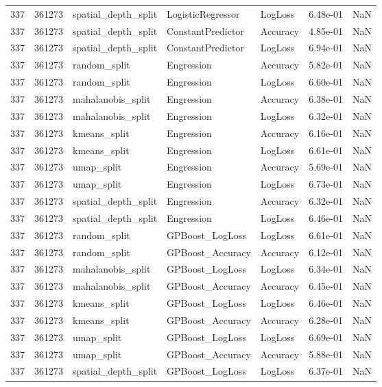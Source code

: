 \begin{tabular}{rrlllrr}
337 & 361273 & spatial\_depth\_split & LogisticRegressor & LogLoss & 6.48e-01 & NaN \\
337 & 361273 & spatial\_depth\_split & ConstantPredictor & Accuracy & 4.85e-01 & NaN \\
337 & 361273 & spatial\_depth\_split & ConstantPredictor & LogLoss & 6.94e-01 & NaN \\
337 & 361273 & random\_split & Engression & Accuracy & 5.82e-01 & NaN \\
337 & 361273 & random\_split & Engression & LogLoss & 6.60e-01 & NaN \\
337 & 361273 & mahalanobis\_split & Engression & Accuracy & 6.38e-01 & NaN \\
337 & 361273 & mahalanobis\_split & Engression & LogLoss & 6.32e-01 & NaN \\
337 & 361273 & kmeans\_split & Engression & Accuracy & 6.16e-01 & NaN \\
337 & 361273 & kmeans\_split & Engression & LogLoss & 6.61e-01 & NaN \\
337 & 361273 & umap\_split & Engression & Accuracy & 5.69e-01 & NaN \\
337 & 361273 & umap\_split & Engression & LogLoss & 6.73e-01 & NaN \\
337 & 361273 & spatial\_depth\_split & Engression & Accuracy & 6.32e-01 & NaN \\
337 & 361273 & spatial\_depth\_split & Engression & LogLoss & 6.46e-01 & NaN \\
337 & 361273 & random\_split & GPBoost\_LogLoss & LogLoss & 6.61e-01 & NaN \\
337 & 361273 & random\_split & GPBoost\_Accuracy & Accuracy & 6.12e-01 & NaN \\
337 & 361273 & mahalanobis\_split & GPBoost\_LogLoss & LogLoss & 6.34e-01 & NaN \\
337 & 361273 & mahalanobis\_split & GPBoost\_Accuracy & Accuracy & 6.45e-01 & NaN \\
337 & 361273 & kmeans\_split & GPBoost\_LogLoss & LogLoss & 6.46e-01 & NaN \\
337 & 361273 & kmeans\_split & GPBoost\_Accuracy & Accuracy & 6.28e-01 & NaN \\
337 & 361273 & umap\_split & GPBoost\_LogLoss & LogLoss & 6.69e-01 & NaN \\
337 & 361273 & umap\_split & GPBoost\_Accuracy & Accuracy & 5.88e-01 & NaN \\
337 & 361273 & spatial\_depth\_split & GPBoost\_LogLoss & LogLoss & 6.37e-01 & NaN \\

\end{tabular}
